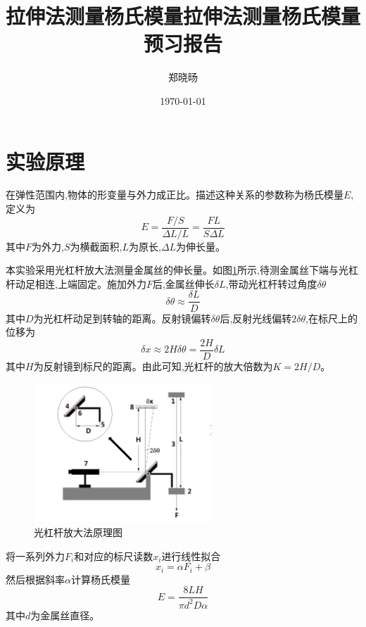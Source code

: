 \documentclass[UTF8]{ctexart}
\title{拉伸法测量杨氏模量}
\title{拉伸法测量杨氏模量预习报告}
\author{郑晓旸}
\date{\today}
\begin{document}
\fancyfoot[C]{\thepage}

\maketitle
\tableofcontents
\newpage
\section{实验原理}

在弹性范围内,物体的形变量与外力成正比。描述这种关系的参数称为杨氏模量$E$,定义为
\begin{equation}
E=\frac{F/S}{\Delta L/L}=\frac{FL}{S\Delta L}
\end{equation}
其中$F$为外力,$S$为横截面积,$L$为原长,$\Delta L$为伸长量。

本实验采用光杠杆放大法测量金属丝的伸长量。如图\ref{fig:principle}所示,待测金属丝下端与光杠杆动足相连,上端固定。施加外力$F$后,金属丝伸长$\delta L$,带动光杠杆转过角度$\delta\theta$
\begin{equation}
\delta\theta\approx\frac{\delta L}{D}
\end{equation}
其中$D$为光杠杆动足到转轴的距离。反射镜偏转$\delta\theta$后,反射光线偏转$2\delta\theta$,在标尺上的位移为
\begin{equation}
\delta x\approx 2H\delta\theta=\frac{2H}{D}\delta L
\end{equation}
其中$H$为反射镜到标尺的距离。由此可知,光杠杆的放大倍数为$K=2H/D$。

\begin{figure}[htbp]
\centering
\includegraphics[width=0.6\textwidth]{principle.png}
\caption{光杠杆放大法原理图}
\label{fig:principle}
\end{figure}

将一系列外力$F_i$和对应的标尺读数$x_i$进行线性拟合
\begin{equation}
x_i=\alpha F_i+\beta
\end{equation}
然后根据斜率$\alpha$计算杨氏模量
\begin{equation}
E=\frac{8LH}{\pi d^2D\alpha}
\end{equation}
其中$d$为金属丝直径。
\end{document}
